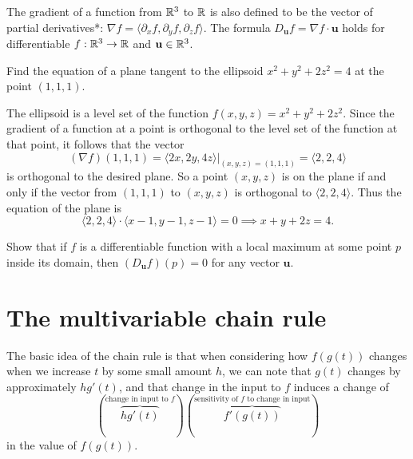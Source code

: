 \documentclass[svgnames]{watsonbook}
\begin{document}
The gradient of a function from $\mathbb{R}^3$ to $\mathbb{R}$ is also defined to
  be the vector of partial derivatives*: 
  $\nabla f = \langle \partial_x f, \partial_y f, \partial_z f
  \rangle$.  The formula
$D_{\mathbf{u}} f = \nabla f \cdot \mathbf{u}$ holds for
differentiable $f:\mathbb{R}^3 \to \mathbb{R}$ and $\mathbf{u} \in \mathbb{R}^3$. 

  \begin{example}{}{}
    Find the equation of a plane tangent to the ellipsoid $x^2 + y^2 +
    2z^2  = 4$ at the point $(1,1,1)$. 
  \end{example}

  \begin{solution}
    The ellipsoid is a level set of the function $f(x,y,z) = x^2 +
    y^2 + 2z^2$. Since the gradient of a function at a point is orthogonal to
    the level set of the function at that point, it follows that the
    vector 
    \[
      (\nabla f)(1,1,1) = \left.\langle 2x, 2y, 4z \rangle\right|_{(x,y,z) =
        (1,1,1)} = \langle 2, 2, 4 \rangle
    \]
    is orthogonal to the desired plane.  So a point $(x,y,z)$ is on the plane
    if and only if the vector from $(1,1,1)$ to $(x,y,z)$ is
    orthogonal to $\langle 2, 2, 4 \rangle$. Thus the equation of the
    plane is
    \[
      \langle 2, 2, 4 \rangle \cdot \langle x - 1, y - 1, z - 1
      \rangle = 0 \implies \boxed{x + y + 2z = 4}. 
    \]
  \end{solution}

  \begin{exercise}{}{}
    Show that if $f$ is a differentiable function with a local maximum
    at some point $p$ inside its domain, then $(D_{\mathbf{u}}f)(p) =
    0$ for any vector $\mathbf{u}$. 
  \end{exercise}

  \section{The multivariable chain rule} \label{sec:chainrule} 


  The basic idea of the chain rule is that when considering how
  $f(g(t))$ changes when we increase $t$ by some small amount $h$, we
  can note that $g(t)$ changes by approximately $hg'(t)$, and that
  change in the input to $f$ induces a change of
  \[
    \left(
      \overbrace{hg'(t)}^{\text{change in input to $f$}} 
    \right) \left( 
    \overbrace{f'(g(t))}^{\text{sensitivity of
        $f$ to change in input}}
    \right) 
  \]
  in the value of $f(g(t))$.
\end{document}
